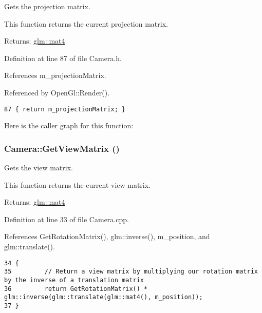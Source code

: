 Gets the projection matrix. 

This function returns the current projection matrix.

\begin{Desc}
\item[Returns:]\hyperlink{group__core__types_g7dcd2365c2e368e6af5b7adeb6a9c8df}{glm::mat4} \end{Desc}


Definition at line 87 of file Camera.h.

References m\_\-projectionMatrix.

Referenced by OpenGl::Render().

\begin{Code}\begin{verbatim}87 { return m_projectionMatrix; }
\end{verbatim}
\end{Code}




Here is the caller graph for this function:\hypertarget{class_camera_ffa333055635aed96518c4c66be9a70c}{
\subsubsection[GetViewMatrix]{ Camera::GetViewMatrix ()}}
\label{class_camera_ffa333055635aed96518c4c66be9a70c}


Gets the view matrix. 

This function returns the current view matrix.

\begin{Desc}
\item[Returns:]\hyperlink{group__core__types_g7dcd2365c2e368e6af5b7adeb6a9c8df}{glm::mat4} \end{Desc}


Definition at line 33 of file Camera.cpp.

References GetRotationMatrix(), glm::inverse(), m\_\-position, and glm::translate().

\begin{Code}\begin{verbatim}34 {
35         // Return a view matrix by multiplying our rotation matrix by the inverse of a translation matrix
36         return GetRotationMatrix() * glm::inverse(glm::translate(glm::mat4(), m_position));
37 }
\end{verbatim}
\end{Code}




